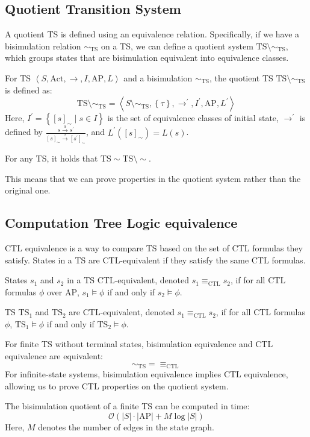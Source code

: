 \subsection{Quotient Transition System}
A quotient TS is defined using an equivalence relation. 
Specifically, if we have a bisimulation relation $\sim_{\text{TS}}$ on a TS, we can define a quotient system $\text{TS}\setminus\sim_{\text{TS}}$, which groups states that are bisimulation equivalent into equivalence classes.
\begin{definition}
    For TS $\left\langle S,\text{Act},\rightarrow,I,\text{AP},L\right\rangle$ and a bisimulation $\sim_{\text{TS}}$, the quotient TS $\text{TS}\setminus\sim_{\text{TS}}$ is defined as:
    \[\text{TS}\setminus\sim_{\text{TS}}=\left\langle S\setminus\sim_{\text{TS}},\left\{\tau\right\},\rightarrow^\prime,I^\prime,\text{AP},L^\prime\right\rangle\]
    Here, $I^\prime=\left\{[s]_{\sim}\mid s \in I\right\}$ is the set of equivalence classes of initial state, $\rightarrow^\prime$ is defined by $\frac{s\xrightarrow{\alpha}s^\prime}{[s]_{\sim}\xrightarrow{\tau}[s^\prime]_{\sim}}$, and $L^\prime([s]_{\sim})=L(s)$.
\end{definition}
\begin{theorem}
    For any TS, it holds that $\text{TS}\sim\text{TS}\setminus\sim$. 
\end{theorem}
\noindent This means that we can prove properties in the quotient system rather than the original one.

\subsection{Computation Tree Logic equivalence}
CTL equivalence is a way to compare TS based on the set of CTL formulas they satisfy. 
States in a TS are CTL-equivalent if they satisfy the same CTL formulas. 

\begin{definition}
    States $s_1$ and $s_2$ in a TS CTL-equivalent, denoted $s_1 \equiv_{\text{CTL}} s_2$, if for all CTL formulas $\phi$ over $\text{AP}$, $s_1 \models \phi$ if and only if $s_2 \models \phi$.
\end{definition}
\begin{definition}
    TS $\text{TS}_1$ and $\text{TS}_2$ are CTL-equivalent, denoted $s_1 \equiv_{\text{CTL}} s_2$, if for all CTL formulas $\phi$, $\text{TS}_1 \models \phi$ if and only if $\text{TS}_2 \models \phi$.
\end{definition}

\noindent For finite TS without terminal states, bisimulation equivalence and CTL equivalence are equivalent:
\[\sim_{\text{TS}}=\equiv_{\text{CTL}}\]
\noindent For infinite-state systems, bisimulation equivalence implies CTL equivalence, allowing us to prove CTL properties on the quotient system.
\begin{theorem}
    The bisimulation quotient of a finite TS can be computed in time:
    \[\mathcal{O} \left(\left\lvert S\right\rvert \cdot \left\lvert \text{AP}\right\rvert  + M  \log \left\lvert S\right\rvert \right)\] 
    Here, $M$ denotes the number of edges in the state graph.
\end{theorem}